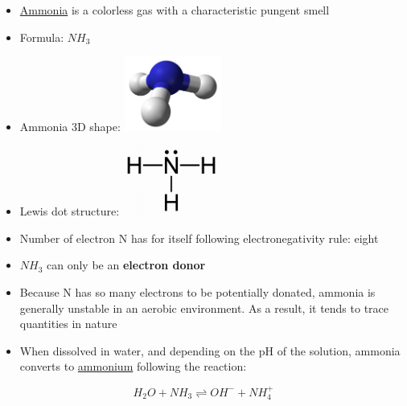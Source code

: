 \documentclass[]{book}
\providecommand{\tightlist}{%
  \setlength{\itemsep}{0pt}\setlength{\parskip}{0pt}}
\theoremstyle{definition}
\theoremstyle{definition}
\theoremstyle{definition}
\theoremstyle{remark}
\begin{document}
\begin{itemize}
\tightlist
\item
  \href{https://en.wikipedia.org/wiki/Ammonia}{Ammonia} is a colorless
  gas with a characteristic pungent smell
\item
  Formula: \(NH_3\)
\item
  Ammonia 3D shape:
  \includegraphics[width=0.25000\textwidth]{pictures/Ammonia-3D-balls-A.png}
\item
  Lewis dot structure:
  \includegraphics[width=0.25000\textwidth]{pictures/ammonia-lewis-structure.jpg}
\item
  Number of electron N has for itself following electronegativity rule:
  eight
\item
  \(NH_3\) can only be an \textbf{electron donor}
\item
  Because N has so many electrons to be potentially donated, ammonia is
  generally unstable in an aerobic environment. As a result, it tends to
  trace quantities in nature
\item
  When dissolved in water, and depending on the pH of the solution,
  ammonia converts to \protect\hyperlink{NH4}{ammonium} following the
  reaction:
\end{itemize}

\[
H_2O + NH_3 \rightleftharpoons OH^{-} + NH_4^{+}
\]
\end{document}
